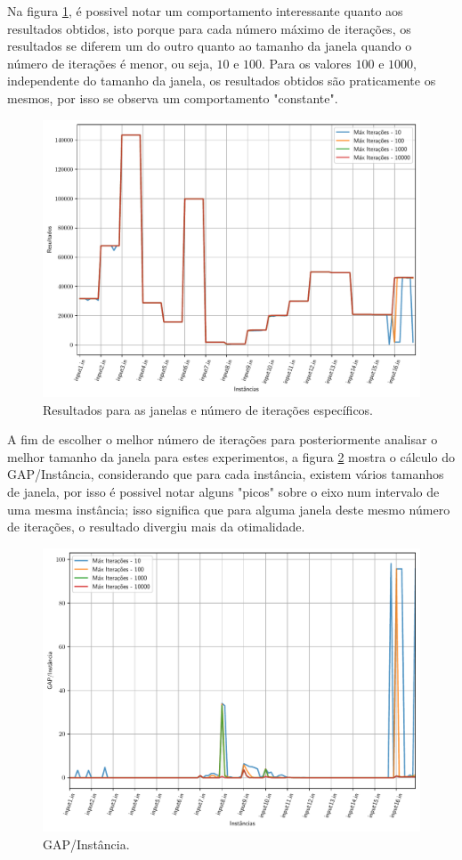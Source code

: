 \documentclass[a4paper, 12pt]{article}
\begin{document}
Na figura \ref{all_grasp}, é possivel notar um comportamento interessante quanto aos resultados obtidos, isto porque
para cada número máximo de iterações, os resultados se diferem um do outro quanto ao tamanho da janela quando
o número de iterações é menor, ou seja, $10$ e $100$. Para os valores $100$ e $1000$, independente do tamanho da janela,
os resultados obtidos são praticamente os mesmos, por isso se observa um comportamento "constante".

\begin{figure}[h]
    \centering
    \includegraphics[width=0.7\linewidth]{../imgs/all_grasp.pdf}
    \caption{Resultados para as janelas e número de iterações específicos.}
    \label{all_grasp}
\end{figure}

A fim de escolher o melhor número de iterações para posteriormente analisar o melhor tamanho da janela
para estes experimentos, a figura \ref{gap_all_grasp} mostra o cálculo do GAP/Instância, considerando que para cada instância, existem vários 
tamanhos de janela, por isso é possivel notar alguns "picos" sobre o eixo num intervalo de uma mesma instância;
isso significa que para alguma janela deste mesmo número de iterações, o resultado divergiu mais da otimalidade.

\begin{figure}[h]
    \centering
    \includegraphics[width=0.7\linewidth]{../imgs/gap_all_grasp.pdf}
    \caption{GAP/Instância.}
    \label{gap_all_grasp}
\end{figure}
\end{document}
